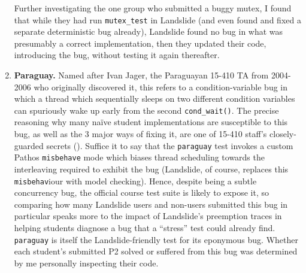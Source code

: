 \begin{enumerate}
Further investigating the one group who submitted a buggy mutex,
I found that while they had run {\tt mutex\_test} in Landslide
(and even found and fixed a separate deterministic bug already),
Landslide found no bug in what was presumably a correct implementation,
then they updated %
their code, introducing the bug, without testing it again thereafter.

\item
{\bf Paraguay.}
Named after Ivan Jager, the Paraguayan 15-410 TA from 2004-2006 who originally discovered it,
this refers to a condition-variable bug in which a thread which sequentially sleeps on two different condition variables
can spuriously wake up early from the second {\tt cond\_wait()}.
The precise reasoning why many na\"ive student implementations are susceptible to this bug,
as well as the 3 major ways of fixing it,
are one of 15-410 staff's closely-guarded secrets (\sect{\ref{sec:410-secrecy}}).
Suffice it to say that the {\tt paraguay} test invokes a custom Pathos {\tt misbehave} mode
which biases thread scheduling towards the interleaving required to exhibit the bug
(Landslide, of course, replaces this {\tt misbehav}iour with model checking).
Hence, despite being a subtle concurrency bug,
the official course test suite is likely to expose it,
so comparing how many Landslide users and non-users submitted this bug in particular
speaks more to the impact of Landslide's preemption traces
in helping students diagnose a bug that a ``stress'' test could already find.
%
{\tt paraguay} is itself the Landslide-friendly test for its eponymous bug.
Whether each student's submitted P2 solved or suffered from this bug
was determined by me personally inspecting their code.


\end{enumerate}
